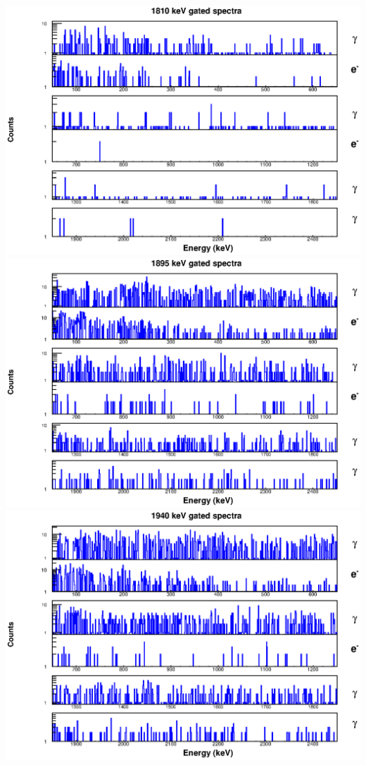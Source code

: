 \includegraphics[scale=0.8]{154Gd_Appendix/1810_combined.eps}
\includegraphics[scale=0.8]{154Gd_Appendix/1895_combined.eps}
\includegraphics[scale=0.8]{154Gd_Appendix/1940_combined.eps}
